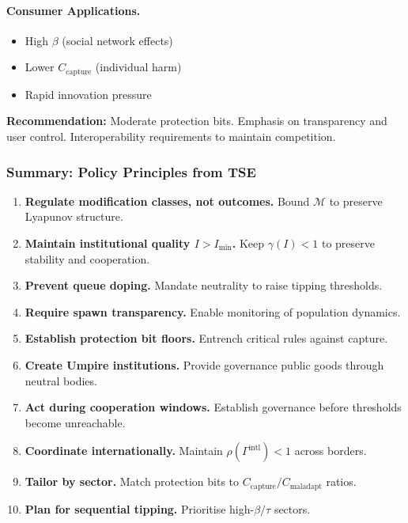 \documentclass[12pt]{article}
\begin{document}
\paragraph{Consumer Applications.}
\begin{itemize}
    \item High $\beta$ (social network effects)
    \item Lower $C_{\text{capture}}$ (individual harm)
    \item Rapid innovation pressure
\end{itemize}
\textbf{Recommendation:} Moderate protection bits. Emphasis on transparency and user control. Interoperability requirements to maintain competition.

\subsubsection{Summary: Policy Principles from TSE}

\begin{enumerate}
    \item \textbf{Regulate modification classes, not outcomes.} Bound $\mathcal{M}$ to preserve Lyapunov structure.
    
    \item \textbf{Maintain institutional quality $I > I_{\min}$.} Keep $\gamma(I) < 1$ to preserve stability and cooperation.
    
    \item \textbf{Prevent queue doping.} Mandate neutrality to raise tipping thresholds.
    
    \item \textbf{Require spawn transparency.} Enable monitoring of population dynamics.
    
    \item \textbf{Establish protection bit floors.} Entrench critical rules against capture.
    
    \item \textbf{Create Umpire institutions.} Provide governance public goods through neutral bodies.
    
    \item \textbf{Act during cooperation windows.} Establish governance before thresholds become unreachable.
    
    \item \textbf{Coordinate internationally.} Maintain $\rho(\Gamma^{\text{intl}}) < 1$ across borders.
    
    \item \textbf{Tailor by sector.} Match protection bits to $C_{\text{capture}} / C_{\text{maladapt}}$ ratios.
    
    \item \textbf{Plan for sequential tipping.} Prioritise high-$\beta / \tau$ sectors.
\end{enumerate}
\end{document}
